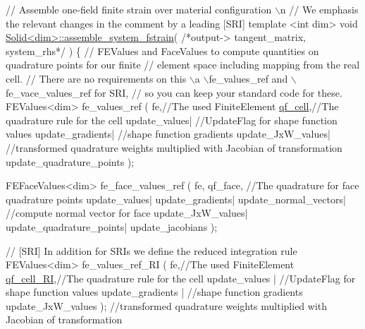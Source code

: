 \begin{DoxyCode}
\textcolor{comment}{// Assemble one-field finite strain over material configuration \(\backslash\)n}
\textcolor{comment}{// We emphasis the relevant changes in the comment by a leading [SRI]}
\textcolor{keyword}{template} <\textcolor{keywordtype}{int} dim>
\textcolor{keywordtype}{void} \hyperlink{classSolid}{Solid<dim>::assemble\_system\_fstrain}( \textcolor{comment}{/*output-> tangent\_matrix,
       system\_rhs*/} )
\{
    \textcolor{comment}{// FEValues and FaceValues to compute quantities on quadrature points for our finite}
    \textcolor{comment}{// element space including mapping from the real cell.}
    \textcolor{comment}{// There are no requirements on this \(\backslash\)a \(\backslash\)fe\_values\_ref and \(\backslash\)fe\_vace\_values\_ref for SRI,}
    \textcolor{comment}{// so you can keep your standard code for these.}
     FEValues<dim> fe\_values\_ref (  fe,\textcolor{comment}{//The used FiniteElement}
                                    \hyperlink{assembly__routine__SRI_8cc_aaaceb34a5b42a4954b2e893607c1bdef}{qf\_cell},\textcolor{comment}{//The quadrature rule for the cell}
                                    update\_values| \textcolor{comment}{//UpdateFlag for shape function values}
                                    update\_gradients| \textcolor{comment}{//shape function gradients}
                                    update\_JxW\_values|  \textcolor{comment}{//transformed quadrature weights multiplied with
       Jacobian of transformation}
                                    update\_quadrature\_points );

     FEFaceValues<dim> fe\_face\_values\_ref ( fe,
                                            qf\_face, \textcolor{comment}{//The quadrature for face quadrature points}
                                            update\_values|
                                            update\_gradients|
                                            update\_normal\_vectors| \textcolor{comment}{//compute normal vector for face}
                                            update\_JxW\_values|
                                            update\_quadrature\_points|
                                            update\_jacobians );

    \textcolor{comment}{// [SRI] In addition for SRIs we define the reduced integration rule}
     FEValues<dim> fe\_values\_ref\_RI (   fe,\textcolor{comment}{//The used FiniteElement}
                                        \hyperlink{assembly__routine__SRI_8cc_ab9727a7376e2656d3cd40c65ac7efb81}{qf\_cell\_RI},\textcolor{comment}{//The quadrature rule for the cell}
                                        update\_values | \textcolor{comment}{//UpdateFlag for shape function values}
                                        update\_gradients | \textcolor{comment}{//shape function gradients}
                                        update\_JxW\_values );  \textcolor{comment}{//transformed quadrature weights multiplied
       with Jacobian of transformation}



\end{DoxyCode}

